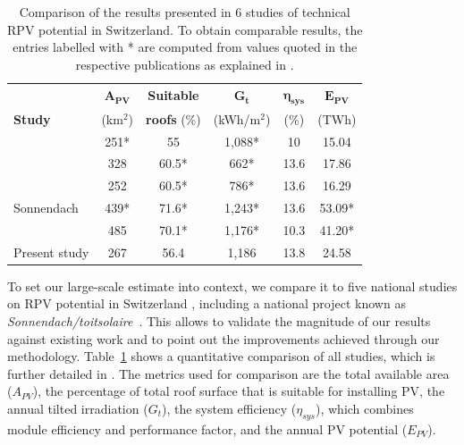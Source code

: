 \begin{table}[b]
\centering
\footnotesize
\begin{tabular}{lccccc}
\hline
 & \textbf{$\mathbf{A_{PV}}$} & \textbf{Suitable} & \textbf{$\mathbf{G_t}$} & \textbf{$\boldsymbol{\eta_{sys}}$} & \textbf{$\mathbf{E_{PV}}$} \\
\textbf{Study}           & (km$^2$) & \textbf{roofs} (\%) & (kWh/m$^2$) & (\%) & (TWh) \\
\hline
\citet{iea_potential_2002}             & 251*               & 55                   & 1,088*             & 10                   & 15.04                   \\
\citet{assouline_quantifying_2017}             & 328                & 60.5*                & 662*               & 13.6                 & 17.86                   \\
\citet{assouline_large-scale_2018}             & 252                & 60.5*                & 786*               & 13.6                 & 16.29                   \\
Sonnendach \cite{klauser_solarpotentialanalyse_2016, portmann_sonnendach.ch:_2016}    & 439*               & 71.6*                & 1,243*             & 13.6                 & 53.09*                  \\
\citet{buffat_scalable_2018}            & 485                & 70.1*                & 1,176*             & 10.3                 & 41.20*                  \\
Present study        & 267                & 56.4                 & 1,186              & 13.8                 & 24.58                   \\ \hline
\end{tabular}

\caption{Comparison of the results presented in 6 studies of technical RPV potential in Switzerland. To obtain comparable results, the entries labelled with * are computed from values quoted in the respective publications as explained in \cite{walch_critical_2019}.}
\label{tab:comparison}
\end{table}

To set our large-scale estimate into context, we compare it to five national studies on RPV potential in Switzerland \cite{iea_potential_2002, assouline_quantifying_2017, assouline_large-scale_2018, klauser_solarpotentialanalyse_2016, buffat_scalable_2018}, including a national project known as \textit{Sonnendach/toitsolaire}~\cite{klauser_solarpotentialanalyse_2016, portmann_sonnendach.ch:_2016}. This allows to validate the magnitude of our results against existing work and to point out the improvements achieved through our methodology.
Table~\ref{tab:comparison} shows a quantitative comparison of all studies, which is further detailed in \cite{walch_critical_2019}. The metrics used for comparison are the total available area ($A_{PV}$), the percentage of total roof surface that is suitable for installing PV, the annual tilted irradiation ($G_t$), the system efficiency ($\eta_{sys}$), which combines module efficiency and performance factor, and the annual PV potential ($E_{PV}$). 

